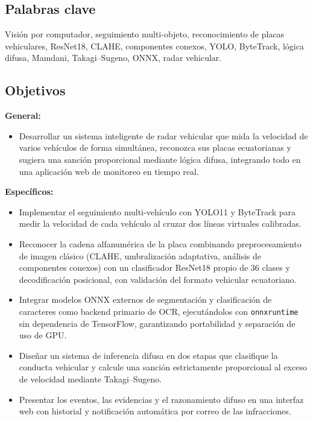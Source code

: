 \documentclass[11pt]{article}
\begin{document}
\subsection{Palabras clave}
Visión por computador, seguimiento multi-objeto, reconocimiento de placas vehiculares,
ResNet18, CLAHE, componentes conexos, YOLO, ByteTrack, lógica difusa, Mamdani,
Takagi--Sugeno, ONNX, radar vehicular.

\subsection{Objetivos}
\textbf{General:}
\begin{itemize}
    \item Desarrollar un sistema inteligente de radar vehicular que mida la velocidad
    de varios vehículos de forma simultánea, reconozca sus placas ecuatorianas y
    sugiera una sanción proporcional mediante lógica difusa, integrando todo en una
    aplicación web de monitoreo en tiempo real.
\end{itemize}

\textbf{Específicos:}
\begin{itemize}
    \item Implementar el seguimiento multi-vehículo con YOLO11 y ByteTrack para medir
    la velocidad de cada vehículo al cruzar dos líneas virtuales calibradas.
    \item Reconocer la cadena alfanumérica de la placa combinando preprocesamiento de
    imagen clásico (CLAHE, umbralización adaptativa, análisis de componentes conexos)
    con un clasificador ResNet18 propio de 36 clases y decodificación posicional, con
    validación del formato vehicular ecuatoriano.
    \item Integrar modelos ONNX externos de segmentación y clasificación de caracteres
    como backend primario de OCR, ejecutándolos con \texttt{onnxruntime} sin
    dependencia de TensorFlow, garantizando portabilidad y separación de uso de GPU.
    \item Diseñar un sistema de inferencia difusa en dos etapas que clasifique la
    conducta vehicular y calcule una sanción estrictamente proporcional al exceso de
    velocidad mediante Takagi--Sugeno.
    \item Presentar los eventos, las evidencias y el razonamiento difuso en una
    interfaz web con historial y notificación automática por correo de las infracciones.
\end{itemize}
\end{document}
